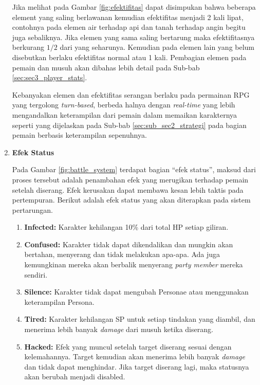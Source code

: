 \begin{enumerate}[label=\textbf{\arabic*).}]
	Jika melihat pada Gambar \ref{fig:efektifitas} dapat disimpukan bahwa beberapa element yang saling berlawanan kemudian efektifitas menjadi 2 kali lipat, contohnya pada elemen air terhadap api dan tanah terhadap angin begitu juga sebaliknya. Jika elemen yang sama saling bertarung maka efektifitasnya berkurang $1/2$ dari yang seharunya. Kemudian pada elemen lain yang belum disebutkan berlaku efektifitas normal atau 1 kali. Pembagian elemen pada pemain dan musuh akan dibahas lebih detail pada Sub-bab \ref{sec:sec3_player_stats}.
	\vspace{1ex}
	
	Kebanyakan elemen dan efektifitas serangan berlaku pada permainan RPG yang tergolong \textit{turn-based}, berbeda halnya dengan \textit{real-time} yang lebih mengandalkan keterampilan dari pemain dalam memaikan karakternya seperti yang dijelaskan pada Sub-bab \ref{sec:sub_sec2_strategi} pada bagian pemain berbasis keterampilan sepenuhnya.
	
	\item \textbf{Efek Status}
	
	Pada Gambar \ref{fig:battle_system} terdapat bagian ``efek status'', maksud dari proses tersebut adalah penambahan efek yang merugikan terhadap pemain setelah diserang. Efek kerusakan dapat membawa kesan lebih taktis pada pertempuran. Berikut adalah efek status yang akan diterapkan pada sistem pertarungan.
	
	\begin{enumerate}[label=\alph*).]
		\item \textbf{Infected:} Karakter kehilangan 10\% dari total HP setiap giliran.
		
		\item \textbf{Confused:} Karakter tidak dapat dikendalikan dan mungkin akan bertahan, menyerang dan tidak melakukan apa-apa. Ada juga kemungkinan mereka akan berbalik menyerang \textit{party member} mereka sendiri.
		
		\item \textbf{Silence:} Karakter tidak dapat mengubah Personae atau menggunakan keterampilan Persona.
		
		\item \textbf{Tired:} Karakter kehilangan SP untuk setiap tindakan yang diambil, dan menerima lebih banyak \textit{damage} dari musuh ketika diserang.
		
		\item \textbf{Hacked:} Efek yang muncul setelah target diserang sesuai dengan kelemahannya. Target kemudian akan menerima lebih banyak \textit{damage} dan tidak dapat menghindar. Jika target diserang lagi, maka statusnya akan berubah menjadi disabled.
		

\end{enumerate}
\end{enumerate}
